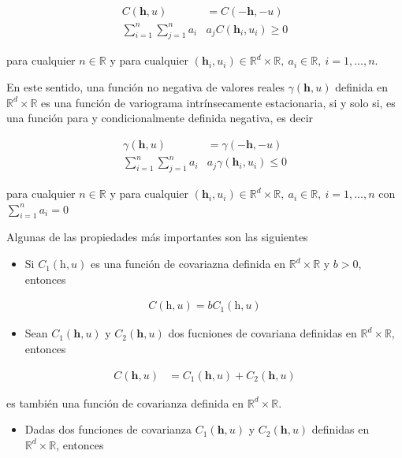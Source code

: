 \documentclass[
]{book}
\providecommand{\tightlist}{%
  \setlength{\itemsep}{0pt}\setlength{\parskip}{0pt}}
\begin{document}
\begin{align}
C(\textbf{h},u)&=C(-\textbf{h},-u)\\
\sum_
{i=1}^{n}\sum_
{j=1}^{n}a_i&a_jC(\textbf{h}_i,u_i) \geq 0
\end{align}

para cualquier \(n\in \mathbb{R}\) y para cualquier \((\textbf{h}_i,u_i) \in \mathbb{R}^d \times \mathbb{R},\ a_i \in \mathbb{R}, \ i=1,...,n\).

En este sentido, una función no negativa de valores reales \(\gamma(\textbf{h},u)\) definida en \(\mathbb{R}^d \times \mathbb{R}\) es una función de variograma intrínsecamente estacionaria, si y solo si, es una función para y condicionalmente definida negativa, es decir

\begin{align}
\gamma(\textbf{h},u)&=\gamma(-\textbf{h},-u)\\
\sum_
{i=1}^{n}\sum_
{j=1}^{n}a_i&a_j\gamma(\textbf{h}_i,u_i) \leq 0
\end{align}

para cualquier \(n\in \mathbb{R}\) y para cualquier \((\textbf{h}_i,u_i) \in \mathbb{R}^d \times \mathbb{R},\ a_i \in \mathbb{R}, \ i=1,...,n\) con \(\sum_{i=1}^na_i=0\)

Algunas de las propiedades más importantes son las siguientes

\begin{itemize}
\tightlist
\item
  Si \(C_1(\text{h},u)\) es una función de covariazna definida en \(\mathbb{R}^d \times \mathbb{R}\) y \(b>0\), entonces
\end{itemize}

\begin{align}
C(\text{h},u)=bC_1(\text{h},u)
\end{align}

\begin{itemize}
\tightlist
\item
  Sean \(C_1(\textbf{h},u)\) y \(C_2(\textbf{h},u)\) dos fucniones de covariana definidas en \(\mathbb{R}^d \times \mathbb{R}\), entonces
\end{itemize}

\begin{align}
C(\textbf{h},u)&=C_1(\textbf{h},u)+C_2(\textbf{h},u)
\end{align}

es también una función de covarianza definida en \(\mathbb{R}^d \times \mathbb{R}\).

\begin{itemize}
\tightlist
\item
  Dadas dos funciones de covarianza \(C_1(\textbf{h},u)\) y \(C_2(\textbf{h},u)\) definidas en \(\mathbb{R}^d \times \mathbb{R}\), entonces
\end{itemize}
\end{document}
